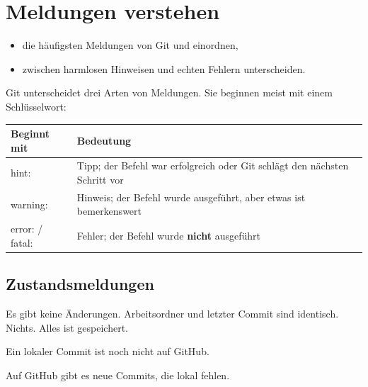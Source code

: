 \chapter{Meldungen verstehen}
\label{kap:meldungen}

\begin{lernziele}
\begin{itemize}[nosep]
  \item die häufigsten Meldungen von Git und  einordnen,
  \item zwischen harmlosen Hinweisen und echten Fehlern unterscheiden.
\end{itemize}
\end{lernziele}

Git unterscheidet drei Arten von Meldungen. Sie beginnen meist mit einem Schlüsselwort:

\begin{center}
\renewcommand{\arraystretch}{1.25}
\begin{tabularx}{\linewidth}{@{}>{\ttfamily}l>{\raggedright\arraybackslash}X@{}}
  \toprule
  \normalfont\textbf{Beginnt mit} & \textbf{Bedeutung} \\
  \midrule
  hint:    & Tipp; der Befehl war erfolgreich oder Git schlägt den nächsten Schritt vor \\
  warning: & Hinweis; der Befehl wurde ausgeführt, aber etwas ist bemerkenswert \\
  error: / fatal: & Fehler; der Befehl wurde \textbf{nicht} ausgeführt \\
  \bottomrule
\end{tabularx}
\end{center}

\section{Zustandsmeldungen}

  {Es gibt keine Änderungen. Arbeitsordner und letzter Commit sind identisch.}
  {Nichts. Alles ist gespeichert.}

  {Ein lokaler Commit ist noch nicht auf GitHub.}
  {}

  {Auf GitHub gibt es neue Commits, die lokal fehlen.}
  {}

